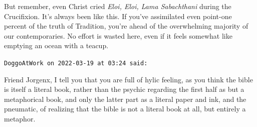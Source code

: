 \begin{footnotesize}
\begin{sffamily}
But remember, even Christ cried \emph{Eloi, Eloi, Lama Sabachthani} during the Crucifixion. It's always been like this. If you've assimilated even point-one percent of the truth of Tradition, you're ahead of the overwhelming majority of our contemporaries. No effort is wasted here, even if it feels somewhat like emptying an ocean with a teacup.

\hfill

\texttt{DoggoAtWork on 2022-03-19 at 03:24 said:}

Friend Jorgenx, I tell you that you are full of hylic feeling, as you think the bible is itself a literal book, rather than the psychic regarding the first half as but a metaphorical book, and only the latter part as a literal paper and ink, and the pneumatic, of realizing that the bible is not a literal book at all, but entirely a metaphor.

\end{sffamily}
\end{footnotesize}

